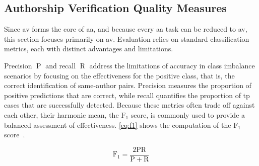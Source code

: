 \subsection{Authorship Verification Quality Measures}
\label{subsec:av_quality_measures}

Since \ac{av} forms the core of \ac{aa}, and because every \ac{aa} task can be reduced to \ac{av}, this section focuses primarily on \ac{av}. 
Evaluation relies on standard classification metrics, each with distinct advantages and limitations.



Precision $\operatorname{P}$ and recall $\operatorname{R}$ address the limitations of accuracy in class imbalance scenarios by focusing on the effectiveness for the positive class, that is, the correct identification of same-author pairs. 
Precision measures the proportion of positive predictions that are correct, while recall quantifies the proportion of \ac{tp} cases that are successfully detected. 
Because these metrics often trade off against each other, their harmonic mean, the $\operatorname{F_{1}}$ score, is commonly used to provide a balanced assessment of effectiveness. 
\autoref{eq:f1} shows the computation of the $\operatorname{F_{1}}$ score~\citep{neal_surveying_2018}.

\begin{equation}\label{eq:f1}
     \operatorname{F_{1}} = \frac{2\mathrm{P}  \mathrm{R}}{\mathrm{P} + \mathrm{R}}
\end{equation}

